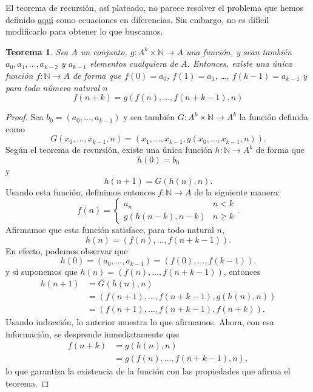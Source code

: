 \documentclass[letter,10pt,notitlepage]{amsart}
\newtheorem{theorem}{Teorema}
\theoremstyle{definition}
\theoremstyle{remark}
\begin{document}
El teorema de recursión, así plateado, no parece resolver el problema que hemos
definido \href{{filename}/posts/recurrencia.md}{aquí} como ecuaciones en diferencias. 
Sin embargo, no es difícil modificarlo para obtener lo que buscamos.

\begin{theorem}
  Sea \( A\) un conjunto, \( g \colon A^{k} \times \mathbb{N} \to A\) una función,
  y sean también \( a_0,a_1,\dots,a_{k-2}\) y \( a_{k-1}\)  elementos cualquiera de \( A\). Entonces,
  existe una única función \( f \colon \mathbb{N} \to A\) de forma
  que \( f(0) = a_0\), \( f(1) = a_1\), \dots, \( f(k-1) = a_{k-1}\)
  y para todo número natural \( n\)
  \[ f(n+k) = g\left( f(n),\dots,f(n+k-1),n \right)\]
\end{theorem}
\begin{proof}
  Sea \( b_0 = (a_0,\dots,a_{k-1})\) y sea también 
  \( G \colon A^{k} \times \mathbb{N} \to A^{k}\) la función definida  como
  \[ G(x_0,\dots,x_{k-1},n) = (x_1,\dots,x_{k-1}, g\left( x_0,\dots,x_{k-1},n\right)).\]
  Según el teorema de recursión, existe una única función \( h \colon \mathbb{N} \to A^{k}\)
  de forma que
  \[ h(0) = b_0\]
  y
  \[ h(n+1) = G(h(n),n).\]
  Usando esta función, definimos entonces \( f \colon \mathbb{N} \to A\) de la siguiente manera:
  \[ f(n) = 
    \begin{cases}
      a_n & n < k \\
      g(h(n-k),n-k) & n \geq k
    \end{cases}.
  \]
  Afirmamos que esta función satisface, para todo natural \( n\),
  \[ h(n) = (f(n), \dots, f(n+k-1)).  \]
  En efecto, podemos observar que
  \[ h(0) = (a_0,\dots,a_{k-1}) = (f(0),\dots,f(k-1)).\]
  y si suponemos que \(h(n) = (f(n), \dots, f(n+k-1))\),
  entonces
  \begin{align*}
    h(n+1) &= G(h(n),n) \\
       &= \left( f(n+1),\dots,f(n+k-1), g(h(n),n) \right) \\
       &= \left( f(n+1),\dots,f(n+k-1), f(n+k) \right).
  \end{align*}
  Usando inducción, lo anterior muestra lo que 
  afirmamos. Ahora, con esa información, se desprende inmediatamente que
  \begin{align*}
    f(n+k) &= g(h(n),n) \\
    &= g(f(n),\dots,f(n+k-1),n),
  \end{align*}
  lo que garantiza la existencia de la función con las propiedades
  que afirma el teorema.


\end{proof}
\end{document}
